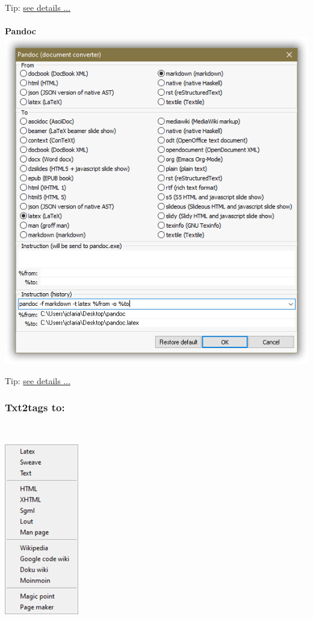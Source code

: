 Tip: \href{http://deplate.sourceforge.net/Output.html}{see details ...}


\newpage
\hypertarget{menu_tools_processing_conversion_pandoc}{}
\paragraph{}\textbf{Pandoc}\\

\includegraphics[scale=.8]{./res/pandoc.png}

Tip: \href{http://johnmacfarlane.net/pandoc/index.html}{see details ...}


\newpage
\hypertarget{menu_tools_processing_conversion_txt2tags}{}
\subsubsection{Txt2tags to:}\\

\includegraphics[scale=0.8]{./res/menu_tools_processing_conversion_txt2tags.png}\\

